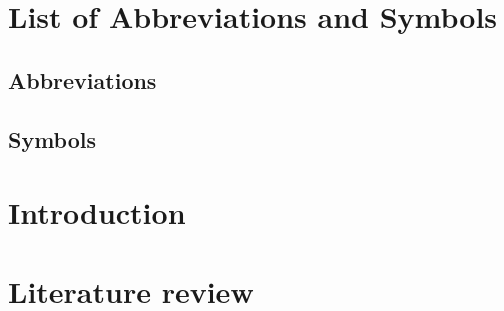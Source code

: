 \documentclass[a4paper,master=mai,masteroption=ecs,english]{kulemt}
\begin{document}
\begin{preface}

\end{preface}
\tableofcontents*
\begin{abstract}

\end{abstract}
\listoffiguresandtables
\chapter{List of Abbreviations and Symbols}
\section*{Abbreviations}

\section*{Symbols}
\mainmatter
\chapter{Introduction}

\chapter{Literature review}

\appendixpage*
\appendix


% 
\backmatter


\end{document}
